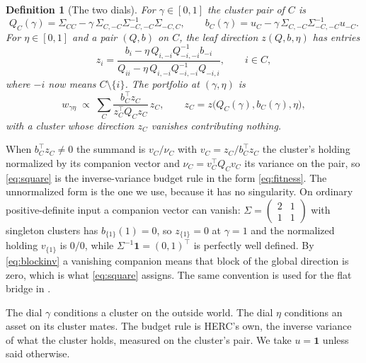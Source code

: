 \documentclass[11pt]{article}
\newcommand{\ones}{\mathbf{1}}
\newtheorem{definition}{Definition}
\begin{document}
\begin{definition}[The two dials]
For $\gamma\in[0,1]$ the \emph{cluster pair} of $C$ is
\begin{equation}
  Q_C(\gamma)=\Sigma_{CC}-\gamma\,\Sigma_{C,-C}\Sigma_{-C,-C}^{-1}\Sigma_{-C,C},
  \qquad
  b_C(\gamma)=u_C-\gamma\,\Sigma_{C,-C}\Sigma_{-C,-C}^{-1}u_{-C} .
  \label{eq:outer}
\end{equation}
For $\eta\in[0,1]$ and a pair $(Q,b)$ on $C$, the \emph{leaf direction}
$z(Q,b,\eta)$ has entries
\begin{equation}
  z_i=\frac{b_i-\eta\,Q_{i,-i}Q_{-i,-i}^{-1}b_{-i}}
           {Q_{ii}-\eta\,Q_{i,-i}Q_{-i,-i}^{-1}Q_{-i,i}},
  \qquad i\in C,
  \label{eq:inner}
\end{equation}
where $-i$ now means $C\setminus\{i\}$. The portfolio at $(\gamma,\eta)$ is
\begin{equation}
  w_{\gamma\eta}\;\propto\;\sum_C
  \frac{b_C^\top z_C}{z_C^\top Q_C z_C}\,z_C,
  \qquad
  z_C=z\big(Q_C(\gamma),b_C(\gamma),\eta\big),
  \label{eq:square}
\end{equation}
with a cluster whose direction $z_C$ vanishes contributing nothing.
\end{definition}

When $b_C^\top z_C\neq0$ the summand is $v_C/\nu_C$ with
$v_C=z_C/b_C^\top z_C$ the cluster's holding normalized by its companion
vector and $\nu_C=v_C^\top Q_Cv_C$ its variance on the pair, so
\eqref{eq:square} is the inverse-variance budget rule in the form
\eqref{eq:fitness}. The unnormalized form is the one we use, because it has
no singularity. On ordinary positive-definite input a companion vector can
vanish: $\Sigma=\left(\begin{smallmatrix}2&1\\1&1\end{smallmatrix}\right)$
with singleton clusters has $b_{\{1\}}(1)=0$, so $z_{\{1\}}=0$ at $\gamma=1$
and the normalized holding $v_{\{1\}}$ is $0/0$, while
$\Sigma^{-1}\ones=(0,1)^\top$ is perfectly well defined. By
\eqref{eq:blockinv} a vanishing companion means that block of the global
direction is zero, which is what \eqref{eq:square} assigns. The same
convention is used for the flat bridge in \cite{cotton2026nco}.

The dial $\gamma$ conditions a cluster on the outside world. The dial
$\eta$ conditions an asset on its cluster mates. The budget rule is HERC's
own, the inverse variance of what the cluster holds, measured on the
cluster's pair. We take $u=\ones$ unless said otherwise.
\end{document}
